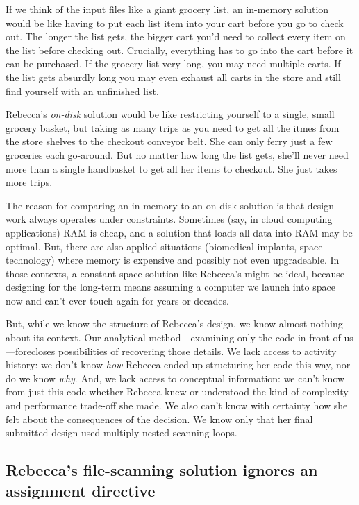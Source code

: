 If we think of the input files like a giant grocery list, an in-memory solution would be like having to put each list item into your cart before you go to check out. The longer the list gets, the bigger cart you'd need to collect every item on the list before checking out. Crucially, everything has to go into the cart before it can be purchased. If the grocery list very long, you may need multiple carts. If the list gets absurdly long you may even exhaust all carts in the store and still find yourself with an unfinished list.

Rebecca's \emph{on-disk} solution would be like restricting yourself to a single, small grocery basket, but taking as many trips as you need to get all the itmes from the store shelves to the checkout conveyor belt. She can only ferry just a few groceries each go-around. But no matter how long the list gets, she'll never need more than a single handbasket to get all her items to checkout. She just takes more trips.

The reason for comparing an in-memory to an on-disk solution is that design work always operates under constraints. Sometimes (say, in cloud computing applications) RAM is cheap, and a solution that loads all data into RAM may be optimal. But, there are also applied situations (biomedical implants, space technology) where memory is expensive and possibly not even upgradeable. In those contexts, a constant-space solution like Rebecca's might be ideal, because designing for the long-term means assuming a computer we launch into space now and can't ever touch again for years or decades.

But, while we know the structure of Rebecca's design, we know almost nothing about its context. Our analytical method---examining only the code in front of us---forecloses possibilities of recovering those details. We lack access to activity history: we don't know \emph{how} Rebecca ended up structuring her code this way, nor do we know \emph{why}. And, we lack access to conceptual information: we can't know from just this code whether Rebecca knew or understood the kind of complexity and performance trade-off she made. We also can't know with certainty how she felt about the consequences of the decision. We know only that her final submitted design used multiply-nested scanning loops.

\subsection{Rebecca's file-scanning solution ignores an assignment directive}\label{rebeccas-file-scanning-solution-ignores-an-assignment-directive}

